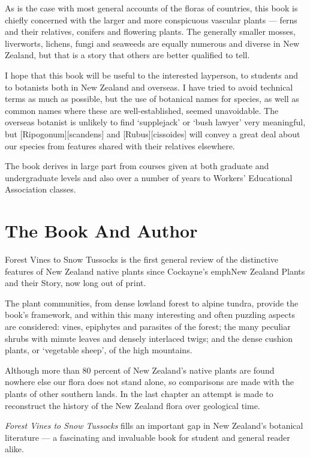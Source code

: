As is the case with most general accounts of the floras of countries, this book is chiefly concerned with the larger and more conspicuous vascular plants --- ferns and their relatives, conifers and flowering plants.
The generally smaller mosses, liverworts, lichens, fungi and seaweeds are equally numerous and diverse in New Zealand, but that is a story that others are better qualified to tell.

I hope that this book will be useful to the interested layperson, to students and to botanists both in New Zealand and overseas.
I have tried to avoid technical terms as much as possible, but the use of botanical names for species, as well as common names where these are well-established, seemed unavoidable.
The overseas botanist is unlikely to find `supplejack' or `bush lawyer' very meaningful, but [Ripogonum][scandens] and [Rubus][cissoides] will convey a great deal about our species from features shared with their relatives elsewhere.

The book derives in large part from courses given at both graduate and undergraduate levels and also over a number of years to Workers' Educational Association classes.

\section*{The Book And Author}

Forest Vines to Snow Tussocks is the first general review of the distinctive features of New Zealand native plants since Cockayne's emph{New Zealand Plants and their Story}, now long out of print.

The plant communities, from dense lowland forest to alpine tundra, provide the book's framework, and within this many interesting and often puzzling aspects are considered: vines, epiphytes and parasites of the forest; the many peculiar shrubs with minute leaves and densely interlaced twigs; and the dense cushion plants, or `vegetable sheep', of the high mountains.

Although more than 80 percent of New Zealand's native plants are found nowhere else our flora does not stand alone, so comparisons are made with the plants of other southern lands.
In the last chapter an attempt is made to reconstruct the history of the New Zealand flora over geological time.

\emph{Forest Vines to Snow Tussocks} fills an important gap in New Zealand's botanical literature — a fascinating and invaluable book for student and general reader alike.

